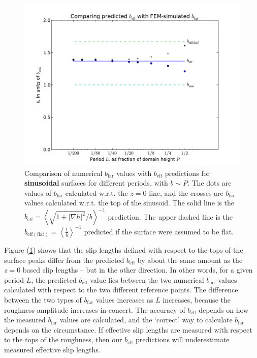 \documentclass[12pt, a4paper, twoside, openright]{book}
\newcommand{\beff}{\ensuremath{b_{\mathrm{eff}}}}
\newcommand{\bfar}{\ensuremath{b_{\mathrm{far}}}}
\newcommand{\beffhf}{\ensuremath{b_{\mathrm{eff (flat)}}} = \left< \frac{1}{b} \right>^{-1} }
\newcommand{\beffha}{\ensuremath{b_{\mathrm{eff}}} = \left< \sqrt{1 + |\nabla h|^2} / {b} \right>^{-1} }
\begin{document}
\clearpage
\begin{figure}[ht]
\includegraphics[scale=0.595]{Lund_Thesis_FEM_plot_sine_corr}
\caption{Comparison of numerical $\bfar$ values with $\beff$ predictions for \textbf{sinusoidal} surfaces for different periods, with $b\sim P$. The dots are values of $\bfar$ calculated w.r.t. the $z=0$ line, and the crosses are $\bfar$ values calculated w.r.t. the top of the sinusoid. The solid line is the $\beffha$ prediction.  The upper dashed line is the $\beffhf$ predicted if the surface were assumed to be flat.}\label{FEMplotsinecorr}
\end{figure}

Figure (\ref{FEMplotsinecorr}) shows that the slip lengths defined with respect to the tops of the surface peaks differ from the predicted $\beff$ by about the same amount as the $z=0$ based slip lengths -- but in the other direction.
In other words, for a given period $L$, the predicted $\beff$ value lies between the two numerical $\bfar$ values calculated with respect to the two different reference points.  The difference between the two types of $\bfar$ values increases as $L$ increases, because the roughness amplitude increases in concert. 
The accuracy of $\beff$ depends on how the measured $\bfar$ values are calculated, and
the `correct' way to calculate $\bfar$ depends on the circumstance.  If effective slip lengths are measured with respect to the tops of the roughness, then our $\beff$ predictions will underestimate measured effective slip lengths. 
\end{document}
